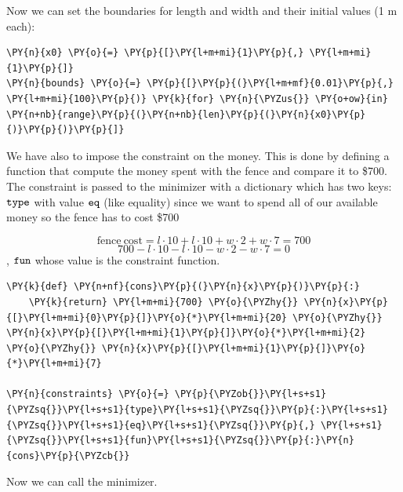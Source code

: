     Now we can set the boundaries for length and width and their initial
values (1 m each):

    \begin{tcolorbox}[breakable, size=fbox, boxrule=1pt, pad at break*=1mm,colback=cellbackground, colframe=cellborder]
\begin{Verbatim}[commandchars=\\\{\}]
\PY{n}{x0} \PY{o}{=} \PY{p}{[}\PY{l+m+mi}{1}\PY{p}{,} \PY{l+m+mi}{1}\PY{p}{]}
\PY{n}{bounds} \PY{o}{=} \PY{p}{[}\PY{p}{(}\PY{l+m+mf}{0.01}\PY{p}{,} \PY{l+m+mi}{100}\PY{p}{)} \PY{k}{for} \PY{n}{\PYZus{}} \PY{o+ow}{in} \PY{n+nb}{range}\PY{p}{(}\PY{n+nb}{len}\PY{p}{(}\PY{n}{x0}\PY{p}{)}\PY{p}{)}\PY{p}{]}
\end{Verbatim}
\end{tcolorbox}

    We have also to impose the constraint on the money. This is done by
defining a function that compute the money spent with the fence and
compare it to \$700. The constraint is passed to the minimizer with a
dictionary which has two keys: \(\tt{type}\) with value \(\tt{eq}\)
(like equality) since we want to spend all of our available money so the
fence has to cost \$700

\[\mathrm{fence~cost} = l\cdot10 + l\cdot10 + w\cdot2 + w\cdot7 = 700\]
\[700 - l\cdot10 - l\cdot10 - w\cdot2 - w\cdot7 = 0\],
\(\tt{fun}\) whose value is the constraint function.

    \begin{tcolorbox}[breakable, size=fbox, boxrule=1pt, pad at break*=1mm,colback=cellbackground, colframe=cellborder]
\begin{Verbatim}[commandchars=\\\{\}]
\PY{k}{def} \PY{n+nf}{cons}\PY{p}{(}\PY{n}{x}\PY{p}{)}\PY{p}{:}
    \PY{k}{return} \PY{l+m+mi}{700} \PY{o}{\PYZhy{}} \PY{n}{x}\PY{p}{[}\PY{l+m+mi}{0}\PY{p}{]}\PY{o}{*}\PY{l+m+mi}{20} \PY{o}{\PYZhy{}} \PY{n}{x}\PY{p}{[}\PY{l+m+mi}{1}\PY{p}{]}\PY{o}{*}\PY{l+m+mi}{2} \PY{o}{\PYZhy{}} \PY{n}{x}\PY{p}{[}\PY{l+m+mi}{1}\PY{p}{]}\PY{o}{*}\PY{l+m+mi}{7}

\PY{n}{constraints} \PY{o}{=} \PY{p}{\PYZob{}}\PY{l+s+s1}{\PYZsq{}}\PY{l+s+s1}{type}\PY{l+s+s1}{\PYZsq{}}\PY{p}{:}\PY{l+s+s1}{\PYZsq{}}\PY{l+s+s1}{eq}\PY{l+s+s1}{\PYZsq{}}\PY{p}{,} \PY{l+s+s1}{\PYZsq{}}\PY{l+s+s1}{fun}\PY{l+s+s1}{\PYZsq{}}\PY{p}{:}\PY{n}{cons}\PY{p}{\PYZcb{}}
\end{Verbatim}
\end{tcolorbox}

    Now we can call the minimizer.

